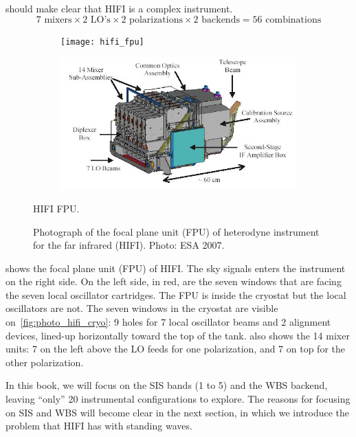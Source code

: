  should make clear that HIFI is a complex instrument.
\begin{equation}
    7 \text{ mixers}
    \times
    2 \text{ LO's}
    \times
    2 \text{ polarizations}
    \times
    2 \text{ backends}
    =
    56 \text{ combinations}
    \label{eq:hifi_56}
\end{equation}
\begin{figure}
    \centering
    \begin{subfigure}[c]{.4\textwidth}
        \texttt{[image: hifi\_fpu]}
    \end{subfigure}%
    \begin{subfigure}[c]{.6\textwidth}
        \includegraphics[width=\textwidth]{hifi_fpu_schematic}
    \end{subfigure}
    \caption{HIFI FPU.}
    \caption*{Photograph of the focal plane unit (FPU) of heterodyne instrument for the far infrared (HIFI).  Photo: ESA 2007.}
    \label{fig:photo_hifi_fpu}
\end{figure}
 shows the focal plane unit (FPU) of HIFI.
The sky signals enters the instrument on the right side.
On the left side, in red, are the seven windows that are facing the seven local oscillator cartridges.
The FPU is inside the cryostat but the local oscillators are not.
The seven windows in the cryostat are visible on~\cref{fig:photo_hifi_cryo}: 9 holes for 7 local oscillator beams and 2 alignment devices, lined-up horizontally toward the top of the tank.
 also shows the 14 mixer units: 7 on the left above the LO feeds for one polarization, and 7 on top for the other polarization.

In this book, we will focus on the SIS bands (1 to 5) and the WBS backend,
leaving ``only'' 20 instrumental configurations to explore.
The reasons for focusing on SIS and WBS will become clear in the next section, in which we introduce the problem that HIFI has with standing waves.

